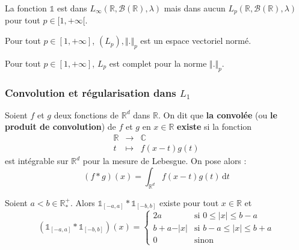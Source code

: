 	\begin{cexample}
		La fonction $\mathbb{1}$ est dans $L_\infty(\mathbb{R}, \mathcal{B}(\mathbb{R}), \lambda)$ mais dans aucun $L_p(\mathbb{R}, \mathcal{B}(\mathbb{R}), \lambda)$ pour tout $p \in [1, +\infty[$.
	\end{cexample}

	\begin{theorem}
		Pour tout $p \in [1, +\infty]$, $(L_p), \Vert . \Vert_p$ est un espace vectoriel normé.
	\end{theorem}

	\begin{theorem}
		Pour tout $p \in [1, +\infty]$, $L_p$ est complet pour la norme $\Vert . \Vert_p$.
	\end{theorem}

	\subsubsection{Convolution et régularisation dans \texorpdfstring{$L_1$}{L₁}}


	\begin{definition}
		Soient $f$ et $g$ deux fonctions de $\mathbb{R}^d$ dans $\mathbb{R}$. On dit que \textbf{la convolée} (ou \textbf{le produit de convolution}) de $f$ et $g$ en $x \in \mathbb{R}$ \textbf{existe} si la fonction
		\[
		\begin{array}{ccc}
			\mathbb{R} &\rightarrow& \mathbb{C} \\
			t &\mapsto& f(x-t)g(t)
		\end{array}
		\]
		est intégrable sur $\mathbb{R}^d$ pour la mesure de Lebesgue. On pose alors :
		\[ (f * g)(x) = \int_{\mathbb{R}^d} f(x-t)g(t) \, \mathrm{d}t \]
	\end{definition}

	\begin{example}
		Soient $a < b \in \mathbb{R}^+_*$. Alors $\mathbb{1}_{[-a, a]} * \mathbb{1}_{[-b,b]}$ existe pour tout $x \in \mathbb{R}$ et
		\[ \left( \mathbb{1}_{[-a, a]} * \mathbb{1}_{[-b,b]} \right)(x) =
		\begin{cases}
			2a &\text{si } 0 \leq \vert x \vert \leq b-a \\
			b+a-\vert x \vert &\text{si } b-a \leq \vert x \vert \leq b+a \\
			0 &\text{sinon}
		\end{cases}
		\]
	\end{example}

